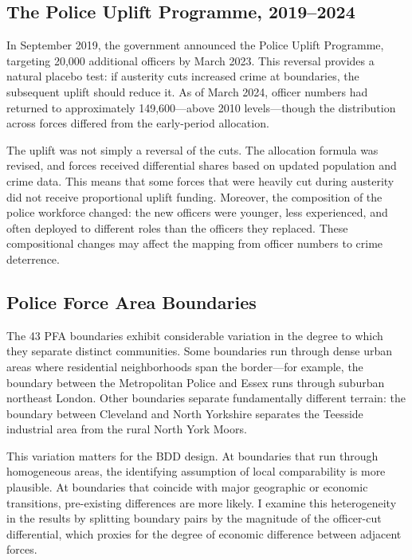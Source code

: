 \documentclass[12pt]{article}
\begin{document}
\subsection{The Police Uplift Programme, 2019--2024}

In September 2019, the government announced the Police Uplift Programme, targeting 20,000 additional officers by March 2023. This reversal provides a natural placebo test: if austerity cuts increased crime at boundaries, the subsequent uplift should reduce it. As of March 2024, officer numbers had returned to approximately 149,600---above 2010 levels---though the distribution across forces differed from the early-period allocation.

The uplift was not simply a reversal of the cuts. The allocation formula was revised, and forces received differential shares based on updated population and crime data. This means that some forces that were heavily cut during austerity did not receive proportional uplift funding. Moreover, the composition of the police workforce changed: the new officers were younger, less experienced, and often deployed to different roles than the officers they replaced. These compositional changes may affect the mapping from officer numbers to crime deterrence.

\subsection{Police Force Area Boundaries}

The 43 PFA boundaries exhibit considerable variation in the degree to which they separate distinct communities. Some boundaries run through dense urban areas where residential neighborhoods span the border---for example, the boundary between the Metropolitan Police and Essex runs through suburban northeast London. Other boundaries separate fundamentally different terrain: the boundary between Cleveland and North Yorkshire separates the Teesside industrial area from the rural North York Moors.

This variation matters for the BDD design. At boundaries that run through homogeneous areas, the identifying assumption of local comparability is more plausible. At boundaries that coincide with major geographic or economic transitions, pre-existing differences are more likely. I examine this heterogeneity in the results by splitting boundary pairs by the magnitude of the officer-cut differential, which proxies for the degree of economic difference between adjacent forces.
\end{document}
